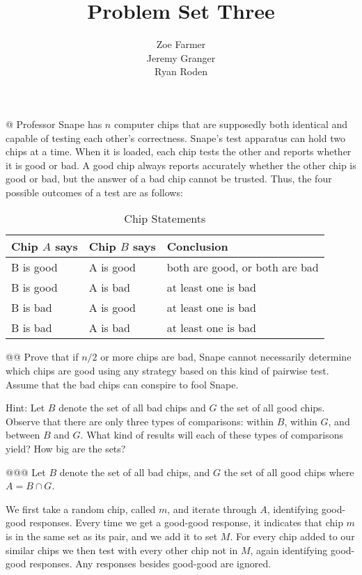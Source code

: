 \documentclass[10pt]{article}
\title{Problem Set Three}
\author{Zoe Farmer\\Jeremy Granger\\Ryan Roden}
\begin{document}
\maketitle

\begin{easylist}[enumerate]
    @ Professor Snape has $n$ computer chips that are supposedly both identical and capable of testing each other's correctness. Snape's test apparatus can hold two chips at a time. When it is loaded, each chip tests the other and reports whether it is good or bad. A good chip always reports accurately whether the other chip is good or bad, but the answer of a bad chip cannot be trusted. Thus, the four possible outcomes of a test are as follows:

        \begin{table}[!ht]
            \centering
            \begin{tabular}{l l l}
                Chip $A$ says & Chip $B$ says & Conclusion\\
                \hline
                B is good & A is good & both are good, or both are bad\\
                B is good & A is bad & at least one is bad\\
                B is bad & A is good & at least one is bad\\
                B is bad & A is bad & at least one is bad\\
            \end{tabular}
            \caption{Chip Statements}
        \end{table}

    @@ Prove that if $n/2$ or more chips are bad, Snape cannot necessarily determine which chips are good using any strategy based on this kind of pairwise test. Assume that the bad chips can conspire to fool Snape.

    Hint: Let $B$ denote the set of all bad chips and $G$ the set of all good chips. Observe that there are only three types of comparisons: within $B$, within $G$, and between $B$ and $G$. What kind of results will each of these types of comparisons yield? How big are the sets?

    @@@ Let $B$ denote the set of all bad chips, and $G$ the set of all good chips where $A = B \cap G$.\newline

        We first take a random chip, called $m$, and iterate through $A$, identifying good-good responses. Every time we get a good-good response, it indicates that chip $m$ is in the same set as its pair, and we add it to set $M$. For every chip added to our similar chips we then test with every other chip not in $M$, again identifying good-good responses. Any responses besides good-good are ignored.\newline


\end{easylist}
\end{document}
